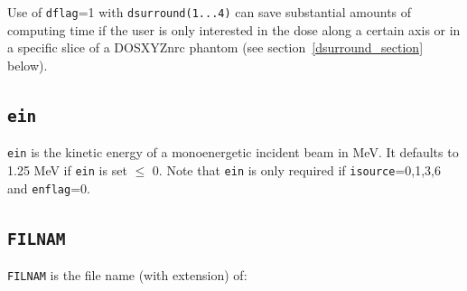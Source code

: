 \documentclass[12pt,twoside]{article}      %
\newcommand{\indexm}[1]{\index{#1}}
\begin{document}
Use of {\tt dflag}=1 with {\tt dsurround(1...4)} can save substantial amounts of
computing time if the user is only interested in the dose along a certain axis
or in a specific slice of a DOSXYZnrc phantom (see section~\ref{dsurround_section}
below).

\subsection{{\tt ein}}
\indexm{ein}

{\tt ein} is the kinetic energy of
a monoenergetic incident beam in MeV.  It defaults to 1.25 MeV if
{\tt ein} is set $\leq$ 0.  Note that {\tt ein} is only required if
{\tt isource}=0,1,3,6 and {\tt enflag}=0.

\subsection{{\tt FILNAM}}
\indexm{FILNAM}

{\tt FILNAM} is the file name (with extension) of:
\end{document}
